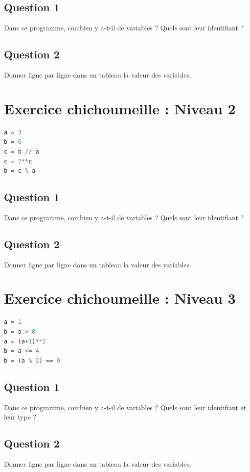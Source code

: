 \subsection*{Question 1}
Dans ce programme, combien y a-t-il de variables ? Quels sont leur identifiant ?

\subsection*{Question 2}
Donner ligne par ligne dans un tableau la valeur des variables.


\vfill

\section*{Exercice chichoumeille : Niveau 2}
\begin{lstlisting}[style=pythonstyle, language=Python]
a = 3
b = 6
c = b // a
c = 2**c
b = c % a
\end{lstlisting}
\subsection*{Question 1}
Dans ce programme, combien y a-t-il de variables ? Quels sont leur identifiant ?

\subsection*{Question 2}
Donner ligne par ligne dans un tableau la valeur des variables.

\vfill

\section*{Exercice chichoumeille : Niveau 3}
\begin{lstlisting}[style=pythonstyle, language=Python]
a = 1
b = a > 0
a = (a+1)**2
b = a <= 4
b = (a % 2) == 0
\end{lstlisting}
\subsection*{Question 1}
Dans ce programme, combien y a-t-il de variables ? Quels sont leur identifiant et leur type ?

\subsection*{Question 2}
Donner ligne par ligne dans un tableau la valeur des variables.



